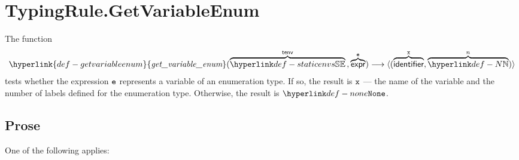 \documentclass{book}
\newcommand\getvariableenum[0]{\hyperlink{def-getvariableenum}{\textfunc{get\_variable\_enum}}}
\begin{document}
\section{TypingRule.GetVariableEnum \label{sec:TypingRule.GetVariableEnum}}
\hypertarget{def-getvariableenum}{}
The function
\[
\getvariableenum(\overname{\staticenvs}{\tenv} \aslsep \overname{\expr}{\ve}) \aslto
\langle (\overname{\identifier}{\vx}, \overname{\N}{n})\rangle
\]
tests whether the expression $\texttt{e}$ represents a variable of an enumeration type.
If so, the result is $\texttt{x}$ --- the name of the variable and the number of labels defined for the enumeration type.
Otherwise, the result is $\None$.

\subsection{Prose}
One of the following applies:
\end{document}
